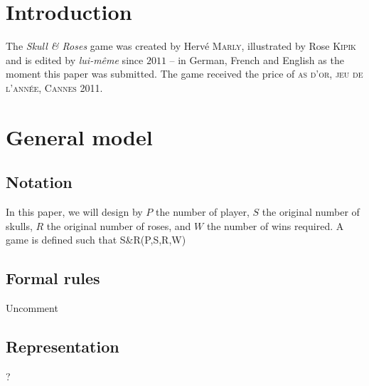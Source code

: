 \documentclass[conference]{IEEEtran}
\newcommand{\sr}{S\&{}R}
\begin{document}
\section{Introduction}
The \emph{Skull \& Roses} game was created by Hervé \textsc{Marly}, illustrated by Rose \textsc{Kipik} and is edited by \emph{lui-même} since $2011$ -- in German, French and English as the moment this paper was submitted. The game received the price of \textsc{as d'or, jeu de l'année, Cannes 2011}.\\



\section{General model}

\subsection{Notation}
In this paper, we will design by $P$ the number of player, $S$ the original number of skulls, $R$ the original number of roses, and $W$ the number of wins required. A game is defined such that \sr(P,S,R,W) \newline




\subsection{Formal rules}
Uncomment %



\subsection{Representation}
?
\end{document}
